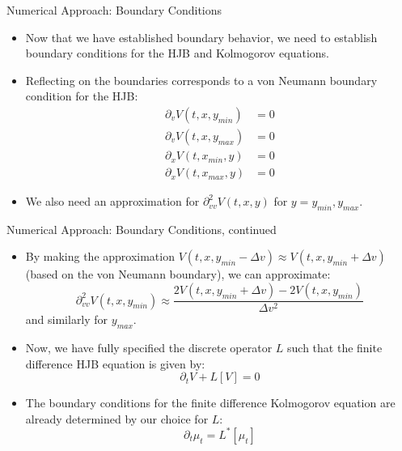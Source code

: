 \documentclass{beamer}
\begin{document}
\begin{frame}{Numerical Approach: Boundary Conditions}
	\begin{itemize}
		\item {
			Now that we have established boundary behavior, we need to establish boundary conditions for the HJB and Kolmogorov equations.
		}
		\item {
			Reflecting on the boundaries corresponds to a von Neumann boundary condition for the HJB:
			\begin{equation}
			\begin{split}
			\partial_v V(t,x,y_{min})&=0 \\
			\partial_v V(t,x,y_{max})&=0 \\
			\partial_x V(t,x_{min},y)&=0 \\
			\partial_x V(t,x_{max},y)&=0
			\end{split}
			\end{equation}
		}
		\item {
			We also need an approximation for $\partial^2_{vv} V(t,x,y)$ for $y=y_{min},y_{max}$.
		}
	\end{itemize}
\end{frame}

\begin{frame}{Numerical Approach: Boundary Conditions, continued}
	\begin{itemize}
		\item {
			By making the approximation $V(t,x,y_{min}-\Delta v) \approx V(t,x,y_{min}+\Delta v)$ (based on the von Neumann boundary), we can approximate:
			\begin{equation}
				\partial^2_{vv} V(t,x,y_{min})\approx \frac{2V(t,x,y_{min}+\Delta v)-2V(t,x,y_{min})}{\Delta v^2}
			\end{equation}
			and similarly for $y_{max}$.
		}
		\item {
			Now, we have fully specified the discrete operator $L$ such that the finite difference HJB equation is given by:
			\begin{equation}
			\partial_t V+L[V]=0
			\end{equation}
		}
		\item {
			The boundary conditions for the finite difference Kolmogorov equation are already determined by our choice for $L$:
			\begin{equation}
			\partial_t \mu_t=L^*[\mu_t]
			\end{equation}
		}
	\end{itemize}
\end{frame}
\end{document}
